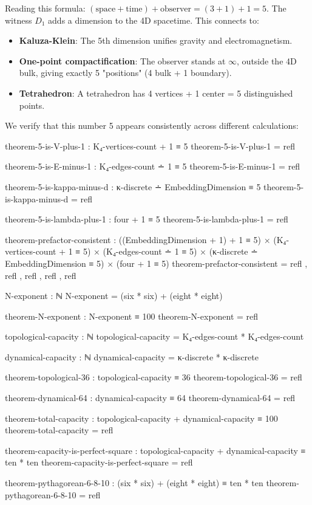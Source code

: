 \documentclass[11pt,a4paper]{book}
\begin{document}
Reading this formula: $(\text{space} + \text{time}) + \text{observer} = (3 + 1) + 1 = 5$.
The witness $D_1$ adds a dimension to the 4D spacetime. This connects to:

\begin{itemize}
\item \textbf{Kaluza-Klein}: The 5th dimension unifies gravity and electromagnetism.
\item \textbf{One-point compactification}: The observer stands at $\infty$, outside 
the 4D bulk, giving exactly 5 "positions" (4 bulk + 1 boundary).
\item \textbf{Tetrahedron}: A tetrahedron has 4 vertices + 1 center = 5 distinguished points.
\end{itemize}

We verify that this number 5 appears consistently across different calculations:

\begin{code}
theorem-5-is-V-plus-1 : K₄-vertices-count + 1 ≡ 5
theorem-5-is-V-plus-1 = refl

theorem-5-is-E-minus-1 : K₄-edges-count ∸ 1 ≡ 5
theorem-5-is-E-minus-1 = refl

theorem-5-is-kappa-minus-d : κ-discrete ∸ EmbeddingDimension ≡ 5
theorem-5-is-kappa-minus-d = refl

theorem-5-is-lambda-plus-1 : four + 1 ≡ 5
theorem-5-is-lambda-plus-1 = refl

theorem-prefactor-consistent : 
  ((EmbeddingDimension + 1) + 1 ≡ 5) ×
  (K₄-vertices-count + 1 ≡ 5) ×
  (K₄-edges-count ∸ 1 ≡ 5) ×
  (κ-discrete ∸ EmbeddingDimension ≡ 5) ×
  (four + 1 ≡ 5)
theorem-prefactor-consistent = refl , refl , refl , refl , refl
\end{code}

\begin{code}
N-exponent : ℕ
N-exponent = (six * six) + (eight * eight)

theorem-N-exponent : N-exponent ≡ 100
theorem-N-exponent = refl

topological-capacity : ℕ
topological-capacity = K₄-edges-count * K₄-edges-count

dynamical-capacity : ℕ
dynamical-capacity = κ-discrete * κ-discrete

theorem-topological-36 : topological-capacity ≡ 36
theorem-topological-36 = refl

theorem-dynamical-64 : dynamical-capacity ≡ 64
theorem-dynamical-64 = refl

theorem-total-capacity : topological-capacity + dynamical-capacity ≡ 100
theorem-total-capacity = refl

theorem-capacity-is-perfect-square : topological-capacity + dynamical-capacity ≡ ten * ten
theorem-capacity-is-perfect-square = refl

theorem-pythagorean-6-8-10 : (six * six) + (eight * eight) ≡ ten * ten
theorem-pythagorean-6-8-10 = refl
\end{code}
\end{document}
